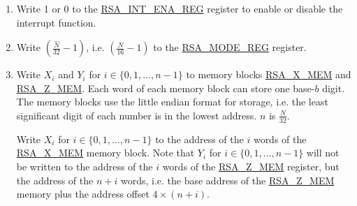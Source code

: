 \documentclass[main\_\_EN.tex]{subfiles}
\begin{document}
\begin{enumerate}

    \item Write 1 or 0 to the \hyperref[regdesc:RSAINTENAREG]{RSA\_INT\_ENA\_REG} register to enable or disable the interrupt function.
    
    \item Write \begin{math}( \frac{\hat{N}}{32} - 1 )\end{math}, i.e. \begin{math}( \frac{N}{16} - 1 )\end{math} to the \hyperref[regdesc:RSAMODEREG]{RSA\_MODE\_REG} register.

    \item Write \begin{math}{X}_{i}\end{math} and \begin{math}{Y}_{i}\end{math} for \begin{math}i \in \{ 0, 1, \dots, n-1 \} \end{math} to memory blocks \hyperref[regdesc:RSAmemory]{RSA\_X\_MEM} and \hyperref[regdesc:RSAmemory]{RSA\_Z\_MEM}. Each word of each memory block can store one base-\begin{math}b\end{math} digit. The memory blocks use the little endian format for storage, i.e. the least significant digit of each number is in the lowest address. \begin{math}n\end{math} is \begin{math} \frac{N}{32} \end{math}.
        
         Write \begin{math}{X}_{i}\end{math} for \begin{math}i \in \{ 0, 1, \dots, n-1 \} \end{math} to the address of the \begin{math}i\end{math} words of the \hyperref[regdesc:RSAmemory]{RSA\_X\_MEM} memory block. Note that \begin{math}{Y}_{i}\end{math} for \begin{math}i \in \{ 0, 1, \dots, n-1 \} \end{math} will not be written to the address of the \begin{math}i\end{math} words of the \hyperref[regdesc:RSAmemory]{RSA\_Z\_MEM} register, but the address of the \begin{math}n+i\end{math} words, i.e. the base address of the \hyperref[regdesc:RSAmemory]{RSA\_Z\_MEM} memory plus the address offset \begin{math}4 \times (n+i) \end{math}.
        

\end{enumerate}
\end{document}
